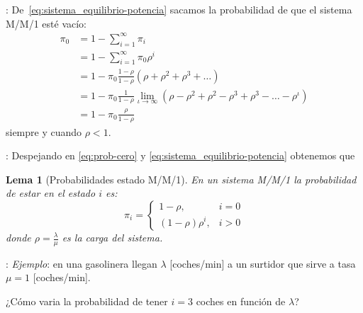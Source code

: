 \documentclass{beamer}
\newtheorem{lema}{Lema}[section]
\begin{document}
\begin{frame}{\secname: \subsecname}
    De~\eqref{eq:sistema_equilibrio-potencia}
    sacamos la
    probabilidad de que el sistema
    M/M/1 esté vacío:
    \begin{align}
        \pi_0 &= 1 - \sum_{i=1}^\infty \pi_i\label{eq:prob-cero}\\
              &= 1 - \sum_{i=1}^\infty \pi_0\rho^i\nonumber\\
              &= 1 - \pi_0\frac{1-\rho}{1-\rho}
        \left(\rho+\rho^2+\rho^3+\ldots  \right)\nonumber\\
        &= 1 - \pi_0\frac{1}{1-\rho}
        \lim_{\iota\to\infty}\left( \rho - \rho^2 + \rho^2 - \rho^3 + \rho^3 - \ldots - \rho^\iota \right)\nonumber\\
        &= 1 - \pi_0 \frac{\rho}{1-\rho}\nonumber
    \end{align}
    siempre y cuando $\rho<1$.
\end{frame}





\begin{frame}{\secname: \subsecname}
    Despejando en \eqref{eq:prob-cero}
    y \eqref{eq:sistema_equilibrio-potencia}
    obtenemos que

    \begin{lema}[Probabilidades estado M/M/1]
        En un sistema M/M/1 la probabilidad
        de estar en el estado $i$ es:
        \begin{equation}
            \pi_i =
            \begin{cases}
                1-\rho, & i=0\\
                (1-\rho)\rho^i, & i>0
            \end{cases}
        \end{equation}
        donde $\rho=\tfrac{\lambda}{\mu}$
        es la carga del sistema.
    \end{lema}
\end{frame}




\begin{frame}{\secname: \subsecname}
    \textit{Ejemplo}: en una gasolinera llegan
    $\lambda$ [coches/min] a un surtidor
    que sirve a tasa $\mu=1$ [coches/min].

    ¿Cómo varia la probabilidad
    de tener $i=3$ coches en función de
    $\lambda$?

    \vfill

    \begin{figure}
        
    \end{figure}
\end{frame}
\end{document}
